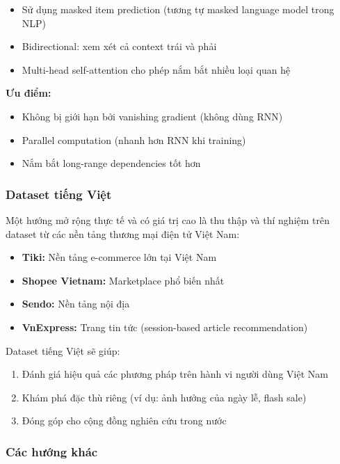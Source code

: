 \documentclass[12pt, a4paper]{article}
\begin{document}
\begin{itemize}
    \item Sử dụng masked item prediction (tương tự masked language model trong NLP)
    \item Bidirectional: xem xét cả context trái và phải
    \item Multi-head self-attention cho phép nắm bắt nhiều loại quan hệ
\end{itemize}

\textbf{Ưu điểm:}
\begin{itemize}
    \item Không bị giới hạn bởi vanishing gradient (không dùng RNN)
    \item Parallel computation (nhanh hơn RNN khi training)
    \item Nắm bắt long-range dependencies tốt hơn
\end{itemize}

\subsubsection{Dataset tiếng Việt}

Một hướng mở rộng thực tế và có giá trị cao là thu thập và thí nghiệm trên dataset từ các nền tảng thương mại điện tử Việt Nam:

\begin{itemize}
    \item \textbf{Tiki:} Nền tảng e-commerce lớn tại Việt Nam
    \item \textbf{Shopee Vietnam:} Marketplace phổ biến nhất
    \item \textbf{Sendo:} Nền tảng nội địa
    \item \textbf{VnExpress:} Trang tin tức (session-based article recommendation)
\end{itemize}

Dataset tiếng Việt sẽ giúp:
\begin{enumerate}
    \item Đánh giá hiệu quả các phương pháp trên hành vi người dùng Việt Nam
    \item Khám phá đặc thù riêng (ví dụ: ảnh hưởng của ngày lễ, flash sale)
    \item Đóng góp cho cộng đồng nghiên cứu trong nước
\end{enumerate}

\subsubsection{Các hướng khác}
\end{document}
